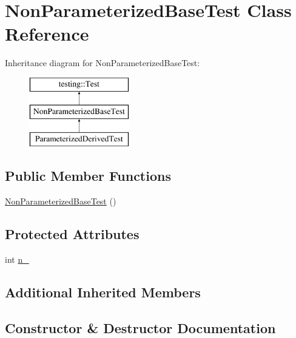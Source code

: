 \hypertarget{classNonParameterizedBaseTest}{}\section{Non\+Parameterized\+Base\+Test Class Reference}
\label{classNonParameterizedBaseTest}
Inheritance diagram for Non\+Parameterized\+Base\+Test\+:\begin{figure}[H]
\begin{center}
\leavevmode
\includegraphics[height=3.000000cm]{classNonParameterizedBaseTest}
\end{center}
\end{figure}
\subsection*{Public Member Functions}
\begin{DoxyCompactItemize}
\item 
\mbox{\hyperlink{classNonParameterizedBaseTest_aeef052bc258fa8bbe44d550a82d28fe6}{Non\+Parameterized\+Base\+Test}} ()
\end{DoxyCompactItemize}
\subsection*{Protected Attributes}
\begin{DoxyCompactItemize}
\item 
int \mbox{\hyperlink{classNonParameterizedBaseTest_a617d4bbfd2aa5f6d41eea3089f7ad039}{n\+\_\+}}
\end{DoxyCompactItemize}
\subsection*{Additional Inherited Members}


\subsection{Constructor \& Destructor Documentation}
\mbox{\label{classNonParameterizedBaseTest_aeef052bc258fa8bbe44d550a82d28fe6}} 
